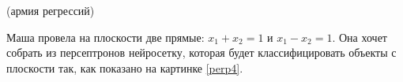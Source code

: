 \documentclass[12pt, a4paper, oneside]{article}
\theoremstyle{plain} %
\theoremstyle{definition}
\begin{document}
\begin{problem}{(армия регрессий)}
\begin{enumerate}
		Маша провела на плоскости две прямые: $x_1 + x_2 = 1$ и $x_1 - x_2 = 1$. Она хочет собрать из персептронов нейросетку, которая будет классифицировать объекты с плоскости так, как показано на картинке \ref{perp4}.
		
		
		
		
	\end{enumerate}
\end{problem}
\end{document}
